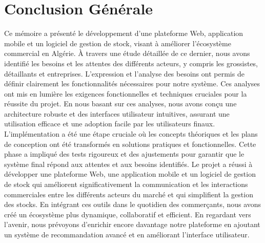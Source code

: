 \documentclass[edit,12pt,a4paper,ChapStyle,oneside,doubleinterligne]{report}
\begin{document}
\chapter{Conclusion Générale}
Ce mémoire a présenté le développement d'une plateforme Web, application mobile et un logiciel de gestion de stock, visant à améliorer l'écosystème commercial en Algérie. À travers une étude détaillée de ce dernier, nous avons identifié les besoins et les attentes des différents acteurs, y compris les grossistes, détaillants et entreprises.
\newline\newline
L'expression et l'analyse des besoins ont permis de définir clairement les fonctionnalités nécessaires pour notre système. Ces analyses ont mis en lumière les exigences fonctionnelles et techniques cruciales pour la réussite du projet. En nous basant sur ces analyses, nous avons conçu une architecture robuste et des interfaces utilisateur intuitives, assurant une utilisation efficace et une adoption facile par les utilisateurs finaux.
\newline \newline
L'implémentation a été une étape cruciale où les concepts théoriques et les plans de conception ont été transformés en solutions pratiques et fonctionnelles. Cette phase a impliqué des tests rigoureux et des ajustements pour garantir que le système final répond aux attentes et aux besoins identifiés.
\newline \newline
Le projet a réussi à développer une plateforme Web, une application mobile et un logiciel de gestion de stock qui améliorent significativement la communication et les interactions commerciales entre les différents acteurs du marché et qui simplifient la gestion des stocks. En intégrant ces outils dans le quotidien des commerçants, nous avons créé un écosystème plus dynamique, collaboratif et efficient.
\newline \newline
En regardant vers l'avenir, nous prévoyons d'enrichir encore davantage notre plateforme en ajoutant un système de recommandation avancé et en améliorant l'interface utilisateur.
\end{document}
